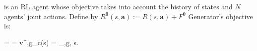 \documentclass{article}
\makeatletter
\newenvironment{smalleralign}[1][\small]
 {\par\nopagebreak\leavevmode\vspace*{-\baselineskip}%
  \skip0=\abovedisplayskip
  #1%
  \def\maketag@@@##1{\hbox{\m@th\normalfont\normalsize##1}}%
  \abovedisplayskip=\skip0
  \align}
 {\endalign\ignorespacesafterend}
\makeatother
\begin{document}
% 
 is an RL agent whose objective takes into account the history of states and $N$ agents' joint actions. Define by $R^{\boldsymbol{\theta}}(s,\boldsymbol{a}):=R(s,\boldsymbol{a})+F^{\boldsymbol{\theta}}$ 
{\selectfont Generator}'s objective is:
\begin{smalleralign}
v^{\boldsymbol{\pi},g}_c(s)  = _{\boldsymbol{\pi},g}\left[ \sum_{t=0}^\infty \gamma^t\left(R^{\boldsymbol{\theta}}(s_t,\boldsymbol{a}_t) +L(s_t,\boldsymbol{a}_t)\right)\Big| s_0=s\right], \quad \forall s\in{}.
\end{smalleralign}
\end{document}
